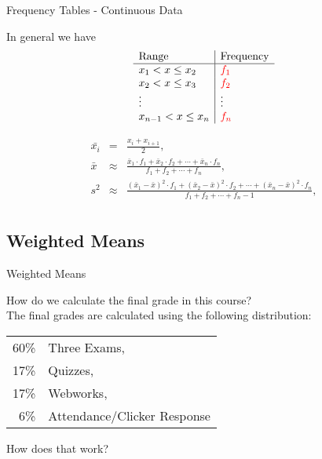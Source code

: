 \begin{frame}{Frequency Tables - Continuous Data}

  In general we have
    \begin{eqnarray*}
      \begin{array}{l|l}
        \mathrm{Range}   & \mathrm{Frequency} \\ \hline
        x_1<x\leq x_2 & {\color{red}f_1} \\
        x_2<x\leq x_3 & {\color{red}f_2} \\
        \vdots & \vdots \\
        x_{n-1}<x\leq x_n & {\color{red}f_n} \\
      \end{array}
    \end{eqnarray*}

    \begin{eqnarray*}
      \bar{x_i} & = & \frac{x_i+x_{i+1}}{2}, \\
      \bar{x} & \approx & \frac{\bar{x}_1\cdot f_1 +  \bar{x}_2\cdot f_2 + \cdots + \bar{x}_n \cdot f_n}{
        f_1+f_2+\cdots+f_n}, \\
      s^2 & \approx & \frac{(\bar{x}_1-\bar{x})^2\cdot f_1 +  (\bar{x}_2-\bar{x})^2\cdot f_2 + \cdots +
        (\bar{x}_n-\bar{x})^2 \cdot f_n}{
        f_1+f_2+\cdots+f_n-1}, \\
    \end{eqnarray*}

  
\end{frame}

\subsection{Weighted Means}

\begin{frame}{Weighted Means}

  How do we calculate the final grade in this course? \\
  The final grades are calculated using the following distribution:
  \begin{tabular}[t]{rl}
    60\% & Three Exams, \\
    17\% & Quizzes, \\
    17\% & Webworks, \\
    6\%  & Attendance/Clicker Response \\
  \end{tabular}

  How does that work?

  
\end{frame}


